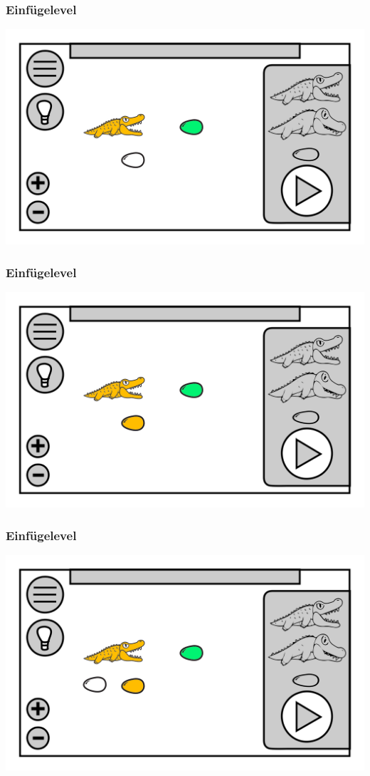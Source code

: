 \documentclass[t]{beamer}
\begin{document}
\begin{frame}
	\frametitle{Einfügelevel}
	\includegraphics[height=\textheight]{level_colored_croc0.png}
\end{frame}
\begin{frame}
	\frametitle{Einfügelevel}
	\includegraphics[height=\textheight]{level_colored_croc01.png}
\end{frame}
\begin{frame}
	\frametitle{Einfügelevel}
	\includegraphics[height=\textheight]{level_colored_croc1.png}
\end{frame}
\end{document}
